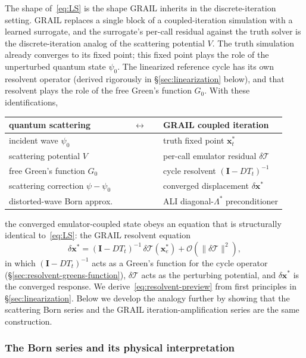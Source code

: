 \documentclass[11pt]{article}
\newcommand{\Lstar}{\Lambda^{*}}
\newcommand{\Tcyc}{\mathcal{T}}
\newcommand{\dT}{\delta\Tcyc}
\begin{document}
The shape of~\eqref{eq:LS} is the shape GRAIL inherits in the
discrete-iteration setting.  GRAIL replaces a single block of a
coupled-iteration simulation with a learned surrogate, and the
surrogate's per-call residual against the truth solver is the
discrete-iteration analog of the scattering potential $V$.  The truth
simulation already converges to its fixed point; this fixed point plays
the role of the unperturbed quantum state $\psi_0$.  The linearized
reference cycle has its own resolvent operator (derived rigorously in
\S\ref{sec:linearization} below), and that resolvent plays the role
of the free Green's function $G_0$.
With these identifications,
\begin{center}
\renewcommand{\arraystretch}{1.2}
\begin{tabular}{@{}lcl@{}}
\toprule
\textbf{quantum scattering} & $\quad\longleftrightarrow\quad$ & \textbf{GRAIL coupled iteration} \\ \midrule
incident wave $\psi_0$              &  & truth fixed point $\mathbf{x}_t^*$ \\
scattering potential $V$            &  & per-call emulator residual $\dT$ \\
free Green's function $G_0$         &  & cycle resolvent $(\mathbf{I} - DT_t)^{-1}$ \\
scattering correction $\psi - \psi_0$ &  & converged displacement $\delta\mathbf{x}^*$ \\
distorted-wave Born approx.\        &  & ALI diagonal-$\Lstar$ preconditioner \\
\bottomrule
\end{tabular}
\end{center}
the converged emulator-coupled state obeys an equation that is
structurally identical to~\eqref{eq:LS}: the GRAIL resolvent equation
\begin{equation}
\boxed{\;\delta\mathbf{x}^{*} = (\mathbf{I} - DT_t)^{-1}\,\dT(\mathbf{x}_e^*) + \mathcal{O}(\|\dT\|^2) ,\;}
\label{eq:resolvent-preview}
\end{equation}
in which $(\mathbf{I} - DT_t)^{-1}$ acts as a Green's function for the
cycle operator (\S\ref{sec:resolvent-greens-function}), $\dT$ acts as
the perturbing potential, and $\delta\mathbf{x}^*$ is the converged
response.  We derive~\eqref{eq:resolvent-preview} from first
principles in \S\ref{sec:linearization}.  Below we develop the analogy
further by showing that the scattering Born series and the GRAIL
iteration-amplification series are the same construction.

\subsubsection{The Born series and its physical interpretation}
\end{document}
